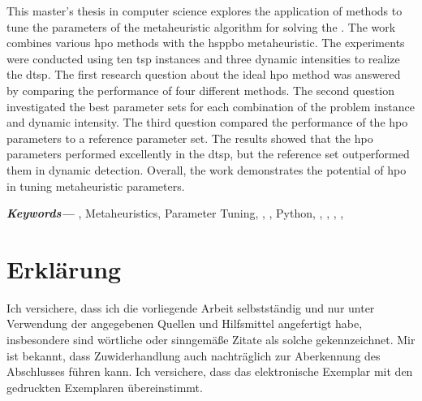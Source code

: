 \documentclass[
  fontsize=12pt,
  a4paper,  %
  twoside,  %
  bibliography=totoc,
  headsepline,
  cleardoublepage=empty,
  parskip=half,
  draft=false
]{scrbook}
\begin{document}
This master's thesis in computer science explores the application of  methods to tune the parameters of the  metaheuristic algorithm for solving the . The work combines various \gls{hpo} methods with the \gls{hsppbo} metaheuristic. The experiments were conducted using ten \gls{tsp} instances and three dynamic intensities to realize the \gls{dtsp}. The first research question about the ideal \gls{hpo} method was answered by comparing the performance of four different methods. The second question investigated the best parameter sets for each combination of the problem instance and dynamic intensity. The third question compared the performance of the \gls{hpo} parameters to a reference parameter set. The results showed that the \gls{hpo} parameters performed excellently in the \gls{dtsp}, but the reference set outperformed them in dynamic detection. Overall, the work demonstrates the potential of \gls{hpo} in tuning metaheuristic parameters.

\small	
\textbf{\textit{Keywords---}}
 , Metaheuristics, Parameter Tuning, ,  , Python, , , , , 

\printbibliography


\printnoidxglossaries

\listoffigures
\listoftables


\listofalgorithms %


\appendix





\chapter*{Erklärung}

Ich versichere, dass ich die vorliegende Arbeit selbstständig und nur unter Verwendung der angegebenen Quellen und Hilfsmittel angefertigt habe, insbesondere sind wörtliche oder sinngemäße Zitate als solche gekennzeichnet. Mir ist bekannt, dass Zuwiderhandlung auch nachträglich zur Aberkennung des Abschlusses führen kann.
Ich versichere, dass das elektronische Exemplar mit den gedruckten Exemplaren übereinstimmt.
\end{document}
